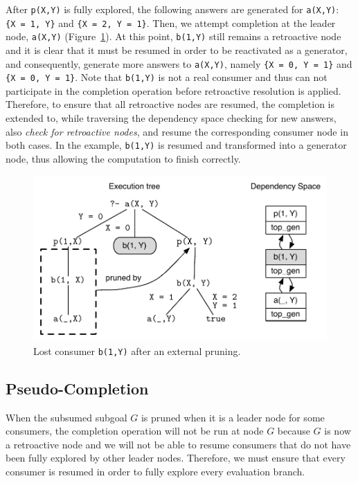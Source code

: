 After \texttt{p(X,Y)} is fully explored, the following answers are generated for \texttt{a(X,Y)}:
\texttt{\{X~=~1,~Y\}} and \texttt{\{X~=~2,~Y~=~1\}}. Then, we attempt completion at the leader node,
\texttt{a(X,Y)} (Figure~\ref{fig:retro_lost_consumer}). At this point, \texttt{b(1,Y)} still remains
a retroactive node and it is clear that it must be resumed in order to be reactivated as a generator,
and consequently, generate more answers to \texttt{a(X,Y)}, namely \texttt{\{X~=~0,~Y~=~1\}} and
\texttt{\{X~=~0,~Y~=~1\}}. Note that \texttt{b(1,Y)} is not a real consumer and thus can not participate
in the completion operation before retroactive resolution is applied. Therefore, to ensure that all
retroactive nodes are resumed, the completion is extended to, while traversing the dependency space
checking for new answers, also \textit{check for retroactive nodes}, and resume the corresponding
consumer node in both cases. In the example, \texttt{b(1,Y)} is resumed and transformed into a
generator node, thus allowing the computation to finish correctly.

\begin{figure}[ht]
  \centering
    \includegraphics[scale=0.6]{retro_lost_consumer.pdf}
  \caption{Lost consumer \texttt{b(1,Y)} after an external pruning.}
  \label{fig:retro_lost_consumer}
\end{figure}

\subsection{Pseudo-Completion}

When the subsumed subgoal $G$ is pruned when it is a leader node for some consumers, the completion operation
will not be run at node $G$ because $G$ is now a retroactive node and we will not be able to resume
consumers that do not have been fully explored by other leader nodes. Therefore, we must ensure
that every consumer is resumed in order to fully explore every evaluation branch.


